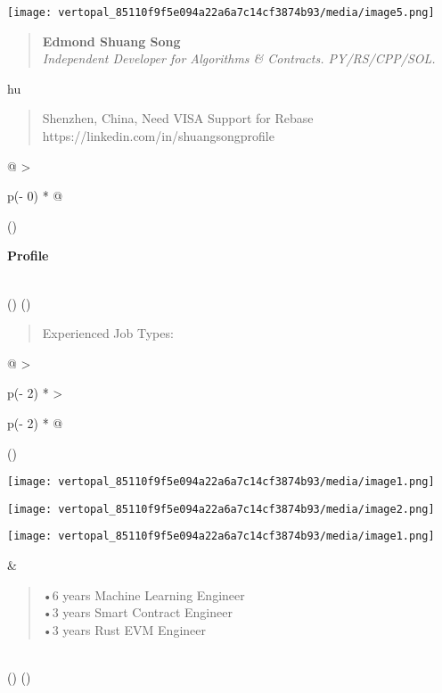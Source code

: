 \documentclass[
]{article}
\author{}
\date{}
\begin{document}
\texttt{[image: vertopal\_85110f9f5e094a22a6a7c14cf3874b93/media/image5.png]}

\begin{quote}
\textbf{Edmond Shuang Song}\\
\emph{Independent Developer for Algorithms \& Contracts. PY/RS/CPP/SOL.}
\end{quote}

hu

\begin{quote}
Shenzhen, China, Need VISA Support for Rebase
https://linkedin.com/in/shuangsongprofile
\end{quote}

\begin{longtable}[]{@{}
  >{\raggedright\arraybackslash}p{(\columnwidth - 0\tabcolsep) * }@{}}
\toprule()
\begin{minipage}[b]{\linewidth}\raggedright
\textbf{Profile}
\end{minipage} \\
\midrule()
\endhead
\bottomrule()
\end{longtable}

\begin{quote}
Experienced Job Types:
\end{quote}

\begin{longtable}[]{@{}
  >{\raggedright\arraybackslash}p{(\columnwidth - 2\tabcolsep) * }
  >{\raggedright\arraybackslash}p{(\columnwidth - 2\tabcolsep) * }@{}}
\toprule()
\begin{minipage}[b]{\linewidth}\raggedright
\texttt{[image: vertopal\_85110f9f5e094a22a6a7c14cf3874b93/media/image1.png]}

\texttt{[image: vertopal\_85110f9f5e094a22a6a7c14cf3874b93/media/image2.png]}

\texttt{[image: vertopal\_85110f9f5e094a22a6a7c14cf3874b93/media/image1.png]}
\end{minipage} & \begin{minipage}[b]{\linewidth}\raggedright
\begin{quote}
•6 years Machine Learning Engineer\\
•3 years Smart Contract Engineer\\
•3 years Rust EVM Engineer
\end{quote}\strut
\end{minipage} \\
\midrule()
\endhead
\bottomrule()
\end{longtable}
\end{document}
